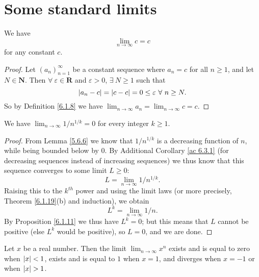 \section{Some standard limits}\label{sec 6.5}

\begin{additional corollary}\label{ac 6.5.1}
We have
\[
    \lim_{n \to \infty} c = c
\]
for any constant \(c\).
\end{additional corollary}

\begin{proof}
Let \((a_n)_{n = 1}^\infty\) be a constant sequence where \(a_n = c\) for all \(n \geq 1\), and let \(N \in \mathbf{N}\).
Then \(\forall\ \varepsilon \in \mathbf{R}\) and \(\varepsilon > 0\), \(\exists\ N \geq 1\) such that
\[
    \abs*{a_n - c} = \abs*{c - c} = 0 \leq \varepsilon \ \forall\ n \geq N.
\]
So by Definition \ref{6.1.8} we have \(\lim_{n \to \infty} a_n = \lim_{n \to \infty} c = c\).
\end{proof}

\begin{corollary}\label{6.5.1}
We have \(\lim_{n \to \infty} 1 / n^{1 / k} = 0\) for every integer \(k \geq 1\).
\end{corollary}

\begin{proof}
From Lemma \ref{5.6.6} we know that \(1 / n^{1 / k}\) is a decreasing function of \(n\), while being bounded below by \(0\).
By Additional Corollary \ref{ac 6.3.1} (for decreasing sequences instead of increasing sequences) we thus know that this sequence converges to some limit \(L \geq 0\):
\[
    L = \lim_{n \to \infty} 1 / n^{1 / k}.
\]
Raising this to the \(k^{th}\) power and using the limit laws (or more precisely, Theorem \ref{6.1.19}(b) and induction), we obtain
\[
    L^k = \lim_{n \to \infty} 1 / n.
\]
By Proposition \ref{6.1.11} we thus have \(L^k = 0\);
but this means that \(L\) cannot be positive (else \(L^k\) would be positive), so \(L = 0\), and we are done.
\end{proof}

\begin{lemma}\label{6.5.2}
Let \(x\) be a real number.
Then the limit \(\lim_{n \to \infty} x^n\) exists and is equal to zero when \(\abs*{x} < 1\), exists and is equal to \(1\) when \(x = 1\), and diverges when \(x = -1\) or when \(\abs*{x} > 1\).
\end{lemma}

